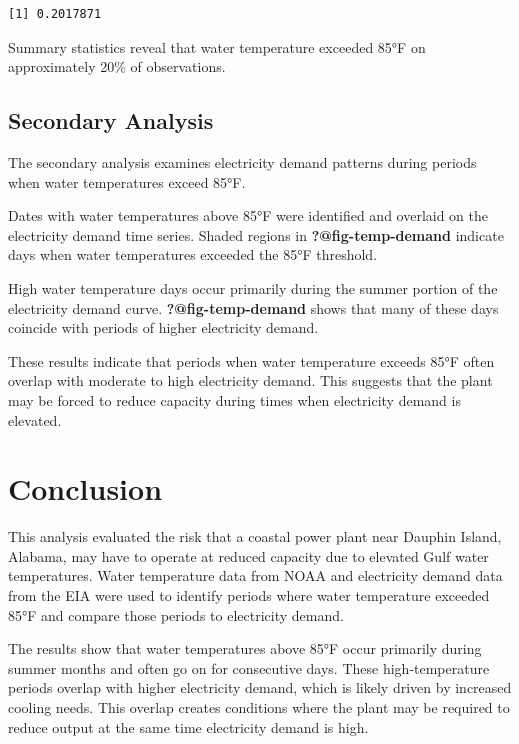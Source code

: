 \documentclass[
  letterpaper,
  DIV=11,
  numbers=noendperiod]{scrreprt}
\begin{document}
\begin{verbatim}
[1] 0.2017871
\end{verbatim}

Summary statistics reveal that water temperature exceeded 85°F on
approximately 20\% of observations.

\section{Secondary Analysis}\label{secondary-analysis}

The secondary analysis examines electricity demand patterns during
periods when water temperatures exceed 85°F.

Dates with water temperatures above 85°F were identified and overlaid on
the electricity demand time series. Shaded regions in
\textbf{?@fig-temp-demand} indicate days when water temperatures
exceeded the 85°F threshold.

High water temperature days occur primarily during the summer portion of
the electricity demand curve. \textbf{?@fig-temp-demand} shows that many
of these days coincide with periods of higher electricity demand.

These results indicate that periods when water temperature exceeds 85°F
often overlap with moderate to high electricity demand. This suggests
that the plant may be forced to reduce capacity during times when
electricity demand is elevated.


\chapter{Conclusion}\label{conclusion}

This analysis evaluated the risk that a coastal power plant near Dauphin
Island, Alabama, may have to operate at reduced capacity due to elevated
Gulf water temperatures. Water temperature data from NOAA and
electricity demand data from the EIA were used to identify periods where
water temperature exceeded 85°F and compare those periods to electricity
demand.

The results show that water temperatures above 85°F occur primarily
during summer months and often go on for consecutive days. These
high-temperature periods overlap with higher electricity demand, which
is likely driven by increased cooling needs. This overlap creates
conditions where the plant may be required to reduce output at the same
time electricity demand is high.
\end{document}
